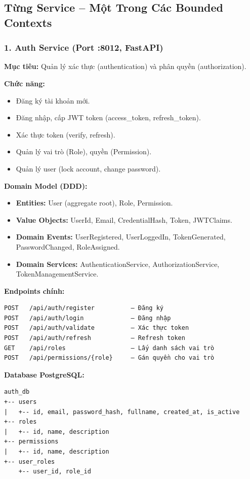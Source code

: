 \documentclass[12pt,a4paper]{article}
\begin{document}
\subsection{Từng Service – Một Trong Các Bounded Contexts}

\subsubsection{1. Auth Service (Port :8012, FastAPI)}

\textbf{Mục tiêu:} Quản lý xác thực (authentication) và phân quyền (authorization).

\textbf{Chức năng:}
\begin{itemize}
    \item Đăng ký tài khoản mới.
    \item Đăng nhập, cấp JWT token (access\_token, refresh\_token).
    \item Xác thực token (verify, refresh).
    \item Quản lý vai trò (Role), quyền (Permission).
    \item Quản lý user (lock account, change password).
\end{itemize}

\textbf{Domain Model (DDD):}
\begin{itemize}
    \item \textbf{Entities:} User (aggregate root), Role, Permission.
    \item \textbf{Value Objects:} UserId, Email, CredentialHash, Token, JWTClaims.
    \item \textbf{Domain Events:} UserRegistered, UserLoggedIn, TokenGenerated, PasswordChanged, RoleAssigned.
    \item \textbf{Domain Services:} AuthenticationService, AuthorizationService, TokenManagementService.
\end{itemize}

\textbf{Endpoints chính:}
\begin{verbatim}
POST   /api/auth/register          – Đăng ký
POST   /api/auth/login             – Đăng nhập
POST   /api/auth/validate          – Xác thực token
POST   /api/auth/refresh           – Refresh token
GET    /api/roles                  – Lấy danh sách vai trò
POST   /api/permissions/{role}     – Gán quyền cho vai trò
\end{verbatim}

\textbf{Database PostgreSQL:}
\begin{verbatim}
auth_db
+-- users
|   +-- id, email, password_hash, fullname, created_at, is_active
+-- roles
|   +-- id, name, description
+-- permissions
|   +-- id, name, description
+-- user_roles
    +-- user_id, role_id
\end{verbatim}
\end{document}
